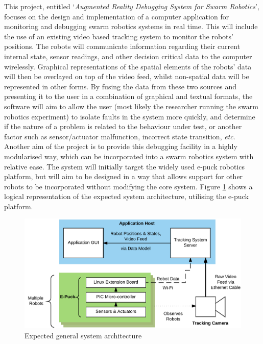 \documentclass[titlepage,hidelinks,10pt]{article}
\begin{document}
This project, entitled `\textit{Augmented Reality Debugging System for Swarm Robotics}', focuses on the design and implementation of a computer application for monitoring and debugging swarm robotics systems in real time. This will include the use of an existing video based tracking system to monitor the robots' positions. The robots will communicate information regarding their current internal state, sensor readings, and other decision critical data to the computer wirelessly. Graphical representations of the spatial elements of the robots' data will then be overlayed on top of the video feed, whilst non-spatial data will be represented in other forms. By fusing the data from these two sources and presenting it to the user in a combination of graphical and textual formats, the software will aim to allow the user (most likely the researcher running the swarm robotics experiment) to isolate faults in the system more quickly, and determine if the nature of a problem is related to the behaviour under test, or another factor such as sensor/actuator malfunction, incorrect state transition, \textit{etc}. Another aim of the project is to provide this debugging facility in a highly modularised way, which can be incorporated into a swarm robotics system with relative ease. The system will initially target the widely used e-puck \cite{EPuck} robotics platform, but will aim to be designed in a way that allows support for other robots to be incorporated without modifying the core system. Figure \ref{fig:SystemArchitecture} shows a logical representation of the expected system architecture, utilising the e-puck platform.

\begin{figure}[H]
	\begin{center}
	\includegraphics[scale=0.8]{SystemArchitecture.png}
	\caption{Expected general system architecture}
	\label{fig:SystemArchitecture}
	\end{center}
\end{figure}
\end{document}
